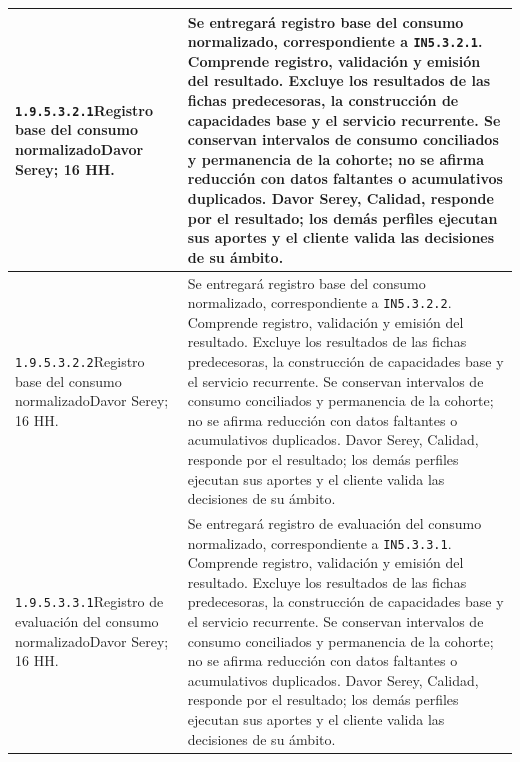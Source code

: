 \begin{longtable}{L{52mm}L{91mm}}
\texttt{1.\allowbreak{}9.\allowbreak{}5.\allowbreak{}3.\allowbreak{}2.\allowbreak{}1}\newline Registro base del consumo normalizado\newline Davor Serey; 16 HH. & Se entregará registro base del consumo normalizado, correspondiente a \texttt{IN5.3.2.1}. Comprende registro, validación y emisión del resultado. Excluye los resultados de las fichas predecesoras, la construcción de capacidades base y el servicio recurrente.  Se conservan intervalos de consumo conciliados y permanencia de la cohorte; no se afirma reducción con datos faltantes o acumulativos duplicados. Davor Serey, Calidad, responde por el resultado; los demás perfiles ejecutan sus aportes y el cliente valida las decisiones de su ámbito.\\\hline
\texttt{1.\allowbreak{}9.\allowbreak{}5.\allowbreak{}3.\allowbreak{}2.\allowbreak{}2}\newline Registro base del consumo normalizado\newline Davor Serey; 16 HH. & Se entregará registro base del consumo normalizado, correspondiente a \texttt{IN5.3.2.2}. Comprende registro, validación y emisión del resultado. Excluye los resultados de las fichas predecesoras, la construcción de capacidades base y el servicio recurrente.  Se conservan intervalos de consumo conciliados y permanencia de la cohorte; no se afirma reducción con datos faltantes o acumulativos duplicados. Davor Serey, Calidad, responde por el resultado; los demás perfiles ejecutan sus aportes y el cliente valida las decisiones de su ámbito.\\\hline
\texttt{1.\allowbreak{}9.\allowbreak{}5.\allowbreak{}3.\allowbreak{}3.\allowbreak{}1}\newline Registro de evaluación del consumo normalizado\newline Davor Serey; 16 HH. & Se entregará registro de evaluación del consumo normalizado, correspondiente a \texttt{IN5.3.3.1}. Comprende registro, validación y emisión del resultado. Excluye los resultados de las fichas predecesoras, la construcción de capacidades base y el servicio recurrente.  Se conservan intervalos de consumo conciliados y permanencia de la cohorte; no se afirma reducción con datos faltantes o acumulativos duplicados. Davor Serey, Calidad, responde por el resultado; los demás perfiles ejecutan sus aportes y el cliente valida las decisiones de su ámbito.\\\hline

\end{longtable}
